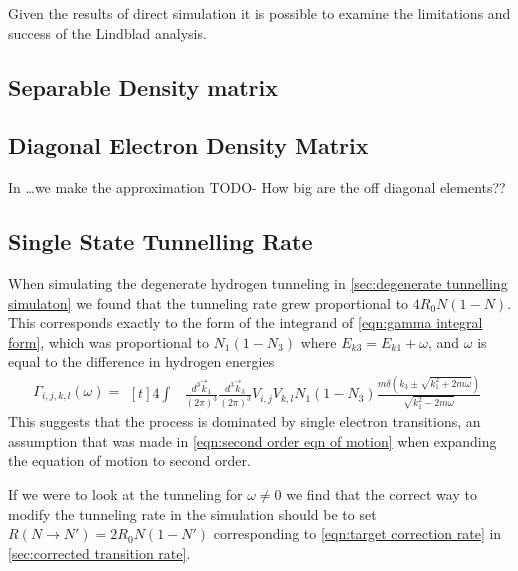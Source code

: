 
Given the results of
direct simulation it is
possible to examine
the limitations
and success of the
Lindblad analysis.

\subsection{Separable Density matrix}

\subsection{Diagonal Electron Density Matrix}
In \ldots we make the approximation
TODO- How big are the off diagonal elements??

\subsection{Single State Tunnelling Rate}\label{sec:lindblad corrected tunneling}
When simulating the
degenerate hydrogen tunneling in
\cref{sec:degenerate tunnelling simulaton}
we found that the tunneling rate
grew proportional to \(4R_0N(1-N)\).
This corresponds exactly to the
form of the integrand of
\cref{eqn:gamma integral form},
which was proportional to
\(N_1(1 - N_3)\) where
\(E_{k3} = E_{k1} + \omega{}\),
and \(\omega{}\) is equal to
the difference in hydrogen energies
\begin{equation}
    \Gamma_{i,j, k,l}(\omega)  =\begin{aligned}[t]
        4 \int &
        \frac{d^3\vec{k}_1}{{(2\pi)}^3}
        \frac{d^3\vec{k}_3}{{(2\pi)}^3}
        V_{i,j} V_{k,l}
        N_1 (1 - N_3)
        \frac{m\delta({k_3 \pm \sqrt{k_1^2 + 2m\omega}})}{\sqrt{k_1^2 - 2m\omega}}
    \end{aligned}
\end{equation}
This suggests
that the process
is dominated
by single electron
transitions, an assumption
that was made in \cref{eqn:second order eqn of motion}
when expanding the equation
of motion to second order.

If we were to look at the
tunneling for \(\omega \neq 0\)
we find that the correct
way to modify the tunneling
rate in the simulation should
be to set
\(R(N\rightarrow{}N') = 2R_0N(1-N')\)
corresponding to \cref{eqn:target correction rate}
in
\cref{sec:corrected transition rate}.


